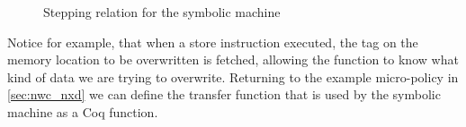 \begin{figure}[H]
\bigskip

\bigskip

\bigskip

\bigskip


\caption{Stepping relation for the symbolic machine}
\label{fig:symbolic_step}
\end{figure}

Notice for example, that when a store instruction executed, the tag on
the memory location to be overwritten is fetched, allowing the
\TRANSFER function to know what kind of data we are trying to
overwrite. Returning to the example micro-policy in \ref{sec:nwc_nxd}
we can define the transfer function that is used by the symbolic machine
as a Coq function.

